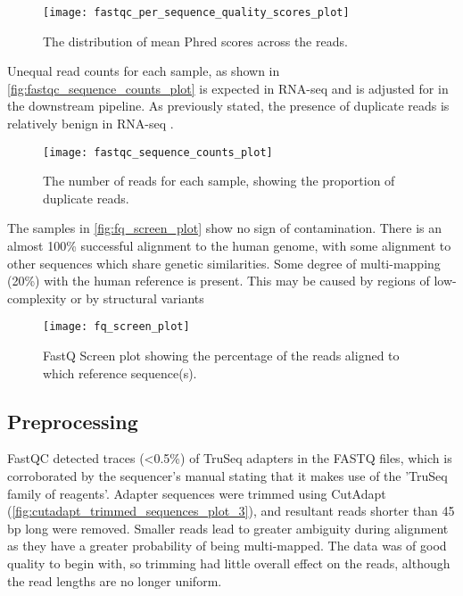\begin{figure}[!h]
    \centering
    \texttt{[image: fastqc\_per\_sequence\_quality\_scores\_plot]}
    \caption{The distribution of mean Phred scores across the reads.} %
    \label{fig:fastqc_per_sequence_quality_scores_plot}
\end{figure}

\newpage
Unequal read counts for each sample, as shown in \autoref{fig:fastqc_sequence_counts_plot} is expected in RNA-seq and is adjusted for in the downstream pipeline. As previously stated, the presence of duplicate reads is relatively benign in RNA-seq \citep{parekh2016impact}.


\begin{figure}[!h]
    \centering
    \texttt{[image: fastqc\_sequence\_counts\_plot]}
    \caption{The number of reads for each sample, showing the proportion of duplicate reads.}
    \label{fig:fastqc_sequence_counts_plot}
\end{figure}
\newpage

The samples in \autoref{fig:fq_screen_plot} show no sign of contamination. There is an almost 100\% successful alignment to the human genome, with some alignment to other sequences which share genetic similarities. Some degree of multi-mapping (20\%) with the human reference is present. This may be caused by regions of low-complexity or by structural variants \citep{rhoads2015pacbio}

\begin{figure}[!h]
    \centering
    \texttt{[image: fq\_screen\_plot]}
    \caption{FastQ Screen plot showing the percentage of the reads aligned to which reference sequence(s).} 
    \label{fig:fq_screen_plot}
\end{figure}


\subsection{Preprocessing}
FastQC detected traces (<0.5\%) of TruSeq adapters in the FASTQ files, which is corroborated by the sequencer's manual \citep{HiSeq2000} stating that it makes use of the 'TruSeq family of reagents'. Adapter sequences were trimmed using CutAdapt (\autoref{fig:cutadapt_trimmed_sequences_plot_3}), and resultant reads shorter than 45 bp long were removed. Smaller reads lead to greater ambiguity during alignment as they have a greater probability of being multi-mapped.  The data was of good quality to begin with, so trimming had little overall effect on the reads, although the read lengths are no longer uniform.


